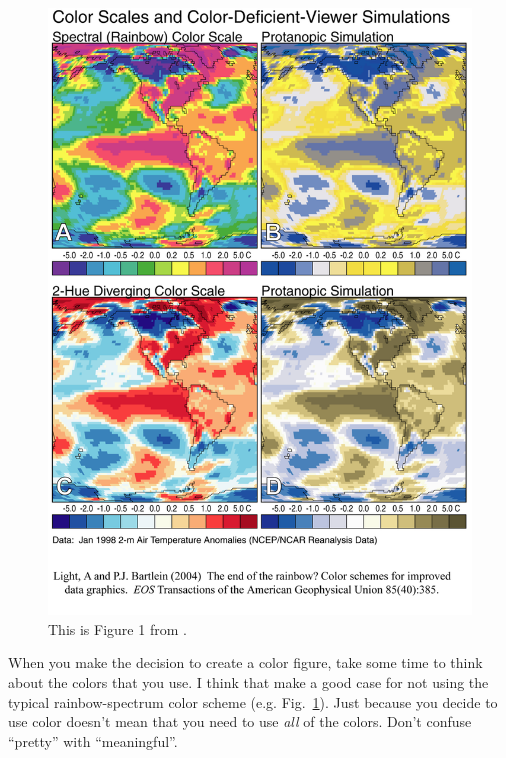 \documentclass[twoside]{article}
\begin{document}
\begin{figure}
\begin{center}
\includegraphics[width=\columnwidth]{lb_fig1.png}
\caption[Color Scales and Color-Deficient-Viewer Simulations]{
    \label{color_scales}
    This is Figure 1 from \citet{2004EOSTr..85..385L}.  
    }
\end{center}
\end{figure}

When you make the decision to create a color figure, take some time
to think about the colors that you use.  I think that
\citet{2004EOSTr..85..385L} make a good case for not using the
typical rainbow-spectrum color scheme (e.g. Fig.~\ref{color_scales}).
Just because you decide to use color doesn't mean that you need to
use \emph{all} of the colors.  Don't confuse ``pretty'' with
``meaningful''.
\end{document}

